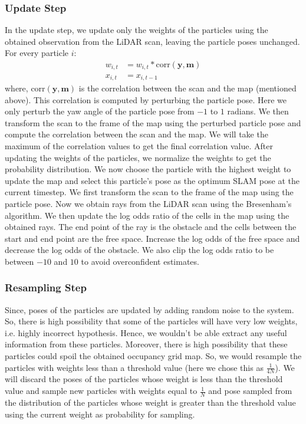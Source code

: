 \documentclass[a4paper]{article}
\begin{document}
\subsubsection{Update Step}
In the update step, we update only the weights of the particles using the obtained observation from the LiDAR scan, leaving the particle poses unchanged. For every particle $i$:
\begin{equation}
    \begin{aligned}
    w_{i,t} &= w_{i,t} * \text{corr}(\mathbf{y}, \mathbf{m}) \\
    x_{i,t} &= x_{i,t-1}
    \end{aligned}
\end{equation}
where, $\text{corr}(\mathbf{y}, \mathbf{m})$ is the correlation between the scan and the map (mentioned above). This correlation is computed by perturbing the particle pose. Here we only perturb the yaw angle of the particle pose from $-1$ to $1$ radians. We then transform the scan to the frame of the map using the perturbed particle pose and compute the correlation between the scan and the map. We will take the maximum of the correlation values to get the final correlation value. After updating the weights of the particles, we normalize the weights to get the probability distribution. We now choose the particle with the highest weight to update the map and select this particle's pose as the optimum SLAM pose at the current timestep. We first transform the scan to the frame of the map using the particle pose. Now we obtain rays from the LiDAR scan using the Bresenham's algorithm. We then update the log odds ratio of the cells in the map using the obtained rays. The end point of the ray is the obstacle and the cells between the start and end point are the free space. Increase the log odds of the free space and decrease the log odds of the obstacle. We also clip the log odds ratio to be between $-10$ and $10$ to avoid overconfident estimates.
\subsubsection{Resampling Step}
Since, poses of the particles are updated by adding random noise to the system. So, there is high possibility that some of the particles will have very low weights, i.e. highly incorrect hypothesis. Hence, we wouldn't be able extract any useful information from these particles. Moreover, there is high possibility that these particles could spoil the obtained occupancy grid map. So, we would resample the particles with weights less than a threshold value (here we chose this as $\frac{1}{4N}$). We will discard the poses of the particles whose weight is less than the threshold value and sample new particles with weights equal to $\frac{1}{N}$ and pose sampled from the distribution of the particles whose weight is greater than the threshold value using the current weight as probability for sampling.
\end{document}
